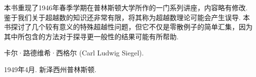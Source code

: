 \begin{pre}
	
	\thispagestyle{empty}
	
	本书重现了1946年春季学期在普林斯顿大学所作的一门系列讲座，内容略有修改. 鉴于我们关于超越数的知识还非常有限，将其称为超越数理论可能会产生误导. 本书探讨了几个较有意义的特殊超越性问题，但它不仅是零散例子的简单汇集，因为其中所包含的方法对于探寻更一般性的结果可能有所帮助.

	卡尔·路德维希·西格尔 (Carl Ludwig Siegel).

	1949年4月. 新泽西州普林斯顿.

	\clearpage
	
	
\end{pre}